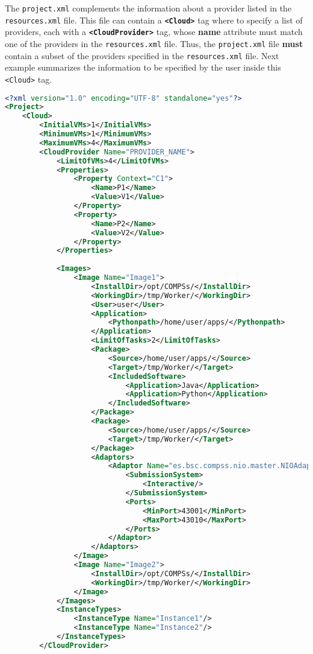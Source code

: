 The \texttt{project.xml} complements the information about a provider listed in the \texttt{resources.xml} file. 
This file can contain a \textbf{\texttt{<Cloud>}} tag where to specify a list of providers, each with a 
\textbf{\texttt{<CloudProvider>}} tag, whose \textbf{name} attribute must match one of the providers in the 
\texttt{resources.xml} file. Thus, the \texttt{project.xml} file \textbf{must} contain a subset of the providers
specified in the \texttt{resources.xml} file. Next example summarizes the information to be specified by the user
inside this \texttt{<Cloud>} tag.

\begin{lstlisting}[language=xml]
<?xml version="1.0" encoding="UTF-8" standalone="yes"?>
<Project>
    <Cloud>
        <InitialVMs>1</InitialVMs>
        <MinimumVMs>1</MinimumVMs>
        <MaximumVMs>4</MaximumVMs>
        <CloudProvider Name="PROVIDER_NAME">
            <LimitOfVMs>4</LimitOfVMs>
            <Properties>
                <Property Context="C1">
                    <Name>P1</Name>
                    <Value>V1</Value>
                </Property>
                <Property>
                    <Name>P2</Name>
                    <Value>V2</Value>
                </Property>
            </Properties>
            
            <Images>
                <Image Name="Image1">
                    <InstallDir>/opt/COMPSs/</InstallDir>
                    <WorkingDir>/tmp/Worker/</WorkingDir>
                    <User>user</User>
                    <Application>
                        <Pythonpath>/home/user/apps/</Pythonpath>
                    </Application>
                    <LimitOfTasks>2</LimitOfTasks>
                    <Package>
                        <Source>/home/user/apps/</Source>
                        <Target>/tmp/Worker/</Target>
                        <IncludedSoftware>
                            <Application>Java</Application>
                            <Application>Python</Application>
                        </IncludedSoftware>
                    </Package>
                    <Package>
                        <Source>/home/user/apps/</Source>
                        <Target>/tmp/Worker/</Target>
                    </Package>
                    <Adaptors>
                        <Adaptor Name="es.bsc.compss.nio.master.NIOAdaptor">
                            <SubmissionSystem>
                                <Interactive/>
                            </SubmissionSystem>
                            <Ports>
                                <MinPort>43001</MinPort>
                                <MaxPort>43010</MaxPort>
                            </Ports>
                        </Adaptor>
                    </Adaptors>
                </Image>
                <Image Name="Image2">
                    <InstallDir>/opt/COMPSs/</InstallDir>
                    <WorkingDir>/tmp/Worker/</WorkingDir>
                </Image>
            </Images>
            <InstanceTypes>
                <InstanceType Name="Instance1"/>
                <InstanceType Name="Instance2"/>
            </InstanceTypes>
        </CloudProvider>
        

\end{lstlisting}
